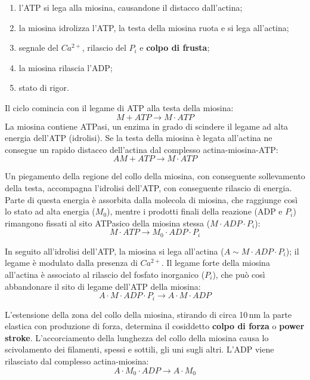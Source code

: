 \begin{enumerate}
  \item l'ATP si lega alla miosina, causandone il distacco dall'actina;
  \item la miosina idrolizza l'ATP, la testa della miosina ruota e si lega all'actina;
  \item segnale del $Ca^{2+}$, rilascio del $P_i$ e \textbf{colpo di frusta};
  \item la miosina rilascia l'ADP;
  \item stato di rigor.
\end{enumerate}

Il ciclo comincia con il legame di ATP alla testa della miosina:
$$M + ATP \rightarrow M \cdot ATP$$
La miosina contiene ATPasi, un enzima in grado di scindere il legame ad alta energia dell'ATP (idrolisi). Se la testa della miosina è legata all'actina ne consegue un rapido distacco dell'actina dal complesso actina-miosina-ATP:
$$AM + ATP \rightarrow M \cdot ATP$$

Un piegamento della regione del collo della miosina, con conseguente sollevamento della testa, accompagna l'idrolisi dell'ATP, con conseguente rilascio di energia. Parte di questa energia è assorbita dalla molecola di miosina, che raggiunge così lo stato ad alta energia ($M_0$), mentre i prodotti finali della reazione (ADP e $P_i$) rimangono fissati al sito ATPasico della miosina stessa ($M \cdot ADP \cdot P_i$):
$$M \cdot ATP \rightarrow M_0 \cdot ADP \cdot P_i$$

In seguito all'idrolisi dell'ATP, la miosina si lega all'actina ($A \sim M \cdot ADP \cdot P_i$); il legame è modulato dalla presenza di $Ca^{2+}$. Il legame forte della miosina all'actina è associato al rilascio del fosfato inorganico ($P_i$), che può così abbandonare il sito di legame dell'ATP della miosina:
$$A \cdot M \cdot ADP \cdot P_i \rightarrow A \cdot M \cdot ADP$$

L'estensione della zona del collo della miosina, stirando di circa 10\,nm la parte elastica con produzione di forza, determina il cosiddetto \textbf{colpo di forza} o \textbf{power stroke}. L'accorciamento della lunghezza del collo della miosina causa lo scivolamento dei filamenti, spessi e sottili, gli uni sugli altri. L'ADP viene rilasciato dal complesso actina-miosina:
$$A \cdot M_0 \cdot ADP \rightarrow A \cdot M_0$$

